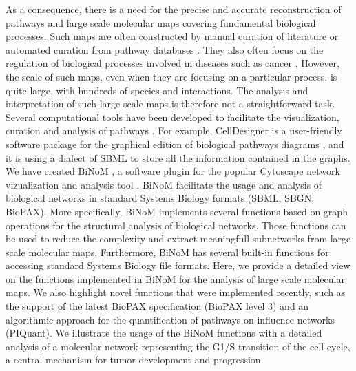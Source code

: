 \documentclass[10pt]{bmc_article}
\newenvironment{bmcformat}{\baselineskip20pt\sloppy\setboolean{publ}{false}}{\baselineskip20pt\sloppy}
\begin{document}
\begin{bmcformat}
As a consequence, there is a need for the precise and accurate reconstruction of
pathways and large scale molecular maps covering fundamental biological
processes. Such maps are often constructed by manual curation of literature or
automated curation from pathway databases \cite{bauer2009pathway}. They also
often focus on the regulation of biological processes involved in diseases such
as cancer \cite{oda2005comprehensive, oda2006comprehensive,
calzone2008comprehensive, caron2010comprehensive}. However, the scale of such
maps, even when they are focusing on a particular process, is quite large, with
hundreds of species and interactions. The analysis and interpretation of such
large scale maps is therefore not a straightforward task. Several computational
tools have been developed to facilitate the visualization, curation and analysis
of pathways \cite{adriaens2008public}. For example, CellDesigner is a
user-friendly software package
for the graphical edition of biological pathways diagrams
\cite{funahashi2003celldesigner}, and it is using a dialect
of SBML to store all the information contained in the graphs. We have created
BiNoM \cite{zinovyev2008binom}, a software plugin for the popular Cytoscape
network vizualization and analysis tool \cite{cline2007integration}. BiNoM
facilitate the usage and analysis of biological networks in standard Systems
Biology formats (SBML, SBGN, BioPAX). More specifically, BiNoM implements
several functions based on graph operations for the structural analysis of
biological networks. Those functions can be used to reduce the complexity and
extract meaningfull subnetworks from large scale molecular maps. Furthermore,
BiNoM has several built-in functions for accessing standard Systems Biology file
formats. 
Here, we provide a detailed view on the functions implemented in BiNoM for the
analysis of large scale molecular maps. We also highlight novel functions that
were implemented recently, such as the support of the latest BioPAX
specification (BioPAX level 3) and an algorithmic approach for the
quantification of pathways on influence networks (PIQuant). We illustrate the
usage of the BiNoM functions with a detailed analysis of a molecular network
representing the G1/S transition of the cell cycle, a central mechanism for
tumor development and progression.


\end{bmcformat}
\end{document}
